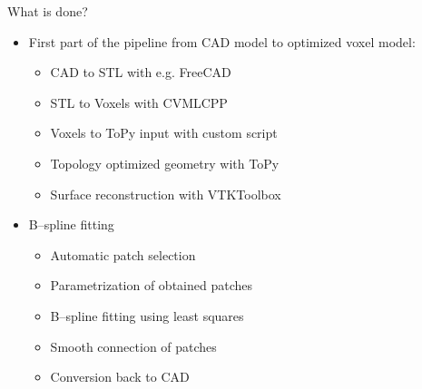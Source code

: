 \begin{frame}{What is done?}
\begin{itemize}
\item First part of the pipeline from CAD model to optimized voxel model:
\begin{itemize}
\item[\textcolor{green}{\Checkmark}] CAD to STL with e.g. FreeCAD
\item[\textcolor{green}{\Checkmark}] STL to Voxels with CVMLCPP
\item[\textcolor{green}{\Checkmark}] Voxels to ToPy input with custom script
\item[\textcolor{green}{\Checkmark}] Topology optimized geometry with ToPy
\item[\textcolor{black}{\VarClock}] Surface reconstruction with VTKToolbox
\end{itemize}
\item B--spline fitting
\begin{itemize}
	\item[\textcolor{red}{\XSolidBrush}] Automatic patch selection
	\item[\textcolor{red}{\XSolidBrush}] Parametrization of obtained patches
	\item[\textcolor{green}{\Checkmark}] B--spline fitting using least squares
	\item[\textcolor{black}{\VarClock}] Smooth connection of patches
	\item[\textcolor{red}{\XSolidBrush}] Conversion back to CAD
\end{itemize}
\end{itemize}
\end{frame}

